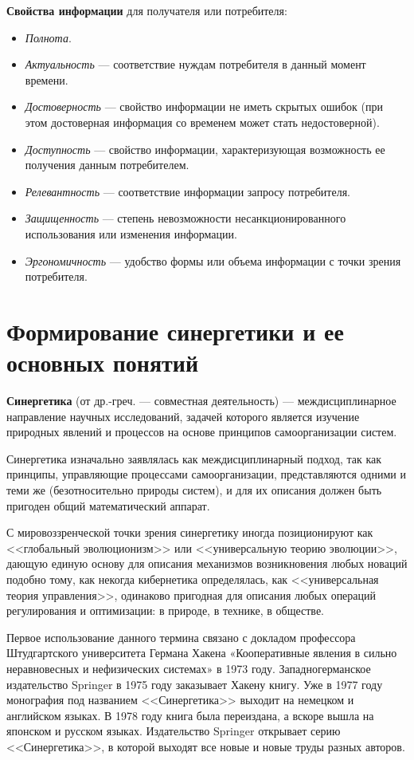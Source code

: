 \textbf{Свойства информации} для получателя или потребителя:
\begin{itemize}
    \item \textit{Полнота}.
    \item \textit{Актуальность} --- соответствие нуждам потребителя в данный момент времени.
    \item \textit{Достоверность} --- свойство информации не иметь скрытых ошибок (при этом достоверная информация со временем может стать недостоверной).
    \item \textit{Доступность} --- свойство информации, характеризующая возможность ее получения данным потребителем.
    \item \textit{Релевантность} --- соответствие информации запросу потребителя.
    \item \textit{Защищенность} --- степень невозможности несанкционированного использования или изменения информации.
    \item \textit{Эргономичность} ---  удобство формы или объема информации с точки зрения потребителя.
\end{itemize}

\section{Формирование синергетики и ее основных понятий}

\textbf{Синергетика} (от др.-греч. --- совместная деятельность) --- междисциплинарное направление научных исследований, задачей которого является изучение природных явлений и процессов на основе принципов самоорганизации систем. 

Синергетика изначально заявлялась как междисциплинарный подход, так как принципы, управляющие процессами самоорганизации, представляются одними и теми же (безотносительно природы систем), и для их описания должен быть пригоден общий математический аппарат. 

С мировоззренческой точки зрения синергетику иногда позиционируют как <<глобальный эволюционизм>> или <<универсальную теорию эволюции>>, дающую единую основу для описания механизмов возникновения любых новаций подобно тому, как некогда кибернетика определялась, как <<универсальная теория управления>>, одинаково пригодная для описания любых операций регулирования и оптимизации: в природе, в технике, в обществе.

Первое использование данного термина связано с докладом профессора Штудгартского университета Германа Хакена «Кооперативные явления в сильно неравновесных и нефизических системах» в 1973 году. Западногерманское издательство Springer в 1975 году заказывает Хакену книгу. Уже в 1977 году монография под названием <<Синергетика>> выходит на немецком и английском языках. В 1978 году книга была переиздана, а вскоре вышла на японском и русском языках. Издательство Springer открывает серию <<Синергетика>>, в которой выходят все новые и новые труды разных авторов.

